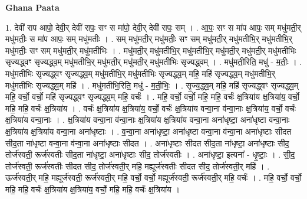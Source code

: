 \documentclass[17pt]{extarticle}
\begin{document}
\textbf{Ghana Paata } \newline

1. देवी॑ राप आपो॒ देवी॒र् देवी॑ रापः॒ सꣳ स मा॑पो॒ देवी॒र् देवी॑ रापः॒ सम् । . आ॒पः॒ सꣳ स मा॑प आपः॒ सम् मधु॑मती॒र् मधु॑मतीः॒ स मा॑प आपः॒ सम् मधु॑मतीः । . सम् मधु॑मती॒र् मधु॑मतीः॒ सꣳ सम् मधु॑मती॒र् मधु॑मतीभि॒र् मधु॑मतीभि॒र् मधु॑मतीः॒ सꣳ सम् मधु॑मती॒र् मधु॑मतीभिः । . मधु॑मती॒र् मधु॑मतीभि॒र् मधु॑मतीभि॒र् मधु॑मती॒र् मधु॑मती॒र् मधु॑मतीभिः सृज्यद्ध्वꣳ सृज्यद्ध्व॒म् मधु॑मतीभि॒र् मधु॑मती॒र् मधु॑मती॒र् मधु॑मतीभिः सृज्यद्ध्वम् । . मधु॑मती॒रिति॒ मधु॑ - म॒तीः॒ । . मधु॑मतीभिः सृज्यद्ध्वꣳ सृज्यद्ध्व॒म् मधु॑मतीभि॒र् मधु॑मतीभिः सृज्यद्ध्व॒म् महि॒ महि॑ सृज्यद्ध्व॒म् मधु॑मतीभि॒र् मधु॑मतीभिः सृज्यद्ध्व॒म् महि॑ । . मधु॑मतीभि॒रिति॒ मधु॑ - म॒ती॒भिः॒ । . सृ॒ज्य॒द्ध्व॒म् महि॒ महि॑ सृज्यद्ध्वꣳ सृज्यद्ध्व॒म् महि॒ वर्चो॒ वर्चो॒ महि॑ सृज्यद्ध्वꣳ सृज्यद्ध्व॒म् महि॒ वर्चः॑ । . महि॒ वर्चो॒ वर्चो॒ महि॒ महि॒ वर्चः॑ क्ष॒त्रिया॑य क्ष॒त्रिया॑य॒ वर्चो॒ महि॒ महि॒ वर्चः॑ क्ष॒त्रिया॑य । . वर्चः॑ क्ष॒त्रिया॑य क्ष॒त्रिया॑य॒ वर्चो॒ वर्चः॑ क्ष॒त्रिया॑य वन्वा॒ना व॑न्वा॒नाः क्ष॒त्रिया॑य॒ वर्चो॒ वर्चः॑ क्ष॒त्रिया॑य वन्वा॒नाः । . क्ष॒त्रिया॑य वन्वा॒ना व॑न्वा॒नाः क्ष॒त्रिया॑य क्ष॒त्रिया॑य वन्वा॒ना अना॑धृष्टा॒ अना॑धृष्टा वन्वा॒नाः क्ष॒त्रिया॑य क्ष॒त्रिया॑य वन्वा॒ना अना॑धृष्टाः । . व॒न्वा॒ना अना॑धृष्टा॒ अना॑धृष्टा वन्वा॒ना व॑न्वा॒ना अना॑धृष्टाः सीदत सीद॒ता ना॑धृष्टा वन्वा॒ना व॑न्वा॒ना अना॑धृष्टाः सीदत । . अना॑धृष्टाः सीदत सीद॒ता ना॑धृष्टा॒ अना॑धृष्टाः सीद॒ तोर्ज॑स्वती॒ रूर्ज॑स्वतीः सीद॒ता ना॑धृष्टा॒ अना॑धृष्टाः सीद॒ तोर्ज॑स्वतीः । . अना॑धृष्टा॒ इत्यना᳚ - धृ॒ष्टाः॒ । . सी॒द॒ तोर्ज॑स्वती॒ रूर्ज॑स्वतीः सीदत सीद॒ तोर्ज॑स्वती॒र् महि॒ मह्यूर्ज॑स्वतीः सीदत सीद॒ तोर्ज॑स्वती॒र् महि॑ । . ऊर्ज॑स्वती॒र् महि॒ मह्यूर्ज॑स्वती॒ रूर्ज॑स्वती॒र् महि॒ वर्चो॒ वर्चो॒ मह्यूर्ज॑स्वती॒ रूर्ज॑स्वती॒र् महि॒ वर्चः॑ । . महि॒ वर्चो॒ वर्चो॒ महि॒ महि॒ वर्चः॑ क्ष॒त्रिया॑य क्ष॒त्रिया॑य॒ वर्चो॒ महि॒ महि॒ वर्चः॑ क्ष॒त्रिया॑य । \newline
\end{document}
